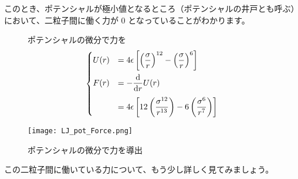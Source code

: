 \documentclass[uplatex,dvipdfmx,a4paper,11pt]{jsarticle}
\begin{document}
このとき、ポテンシャルが極小値となるところ（ポテンシャルの井戸とも呼ぶ）において、二粒子間に働く力が 0 となっていることがわかります。
\begin{figure}[htb]
	\begin{center}
		\begin{minipage}{0.4\textwidth}
			\large
			\begin{itembox}[l]{ポテンシャルの微分で力を}
				\normalsize
				\begin{align*}
					\begin{cases}
						U(r) &= 4 \epsilon \left[ \left(\dfrac{\sigma}{r} \right)^{12} - \left(\dfrac{\sigma}{r} \right)^{6} \right] \\[10pt]
						F(r) &= -\dfrac{\mathrm{d}}{\mathrm{d} r}U(r) \\[10pt]
						&= 4 \epsilon \left[ 12 \left(\dfrac{\sigma^{12}}{r^{13}} \right) - 6 \left(\dfrac{\sigma^6}{r^7} \right) \right]
					\end{cases}
				\end{align*}
			\end{itembox}
		\end{minipage}
		\begin{minipage}{0.5\textwidth}
			\begin{center}
				\texttt{[image: LJ\_pot\_Force.png]}
			\end{center}
		\end{minipage}
		\caption{ポテンシャルの微分で力を導出}
		\label{fig:LJ_pot_Force}
	\end{center}
\end{figure}

この二粒子間に働いている力について、もう少し詳しく見てみましょう。
\end{document}
